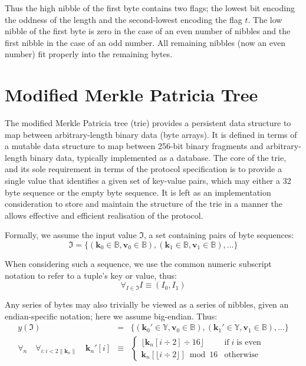 \documentclass[9pt,oneside]{amsart}
\begin{document}
Thus the high nibble of the first byte contains two flags; the lowest bit encoding the oddness of the length and the second-lowest encoding the flag $t$. The low nibble of the first byte is zero in the case of an even number of nibbles and the first nibble in the case of an odd number. All remaining nibbles (now an even number) fit properly into the remaining bytes.

\section{Modified Merkle Patricia Tree}\label{app:trie}
The modified Merkle Patricia tree (trie) provides a persistent data structure to map between arbitrary-length binary data (byte arrays). It is defined in terms of a mutable data structure to map between 256-bit binary fragments and arbitrary-length binary data, typically implemented as a database. The core of the trie, and its sole requirement in terms of the protocol specification is to provide a single value that identifies a given set of key-value pairs, which may either a 32 byte sequence or the empty byte sequence. It is left as an implementation consideration to store and maintain the structure of the trie in a manner the allows effective and efficient realisation of the protocol.

Formally, we assume the input value $\mathfrak{I}$, a set containing pairs of byte sequences:
\begin{equation}
\mathfrak{I} = \{ (\mathbf{k}_0 \in \mathbb{B}, \mathbf{v}_0 \in \mathbb{B}), (\mathbf{k}_1 \in \mathbb{B}, \mathbf{v}_1 \in \mathbb{B}), ... \}
\end{equation}

When considering such a sequence, we use the common numeric subscript notation to refer to a tuple's key or value, thus:
\begin{equation}
\forall_{I \in \mathfrak{I}} I \equiv (I_0, I_1)
\end{equation}

Any series of bytes may also trivially be viewed as a series of nibbles, given an endian-specific notation; here we assume big-endian. Thus:
\begin{eqnarray}
y(\mathfrak{I}) & = & \{ (\mathbf{k}_0' \in \mathbb{Y}, \mathbf{v}_0 \in \mathbb{B}), (\mathbf{k}_1' \in \mathbb{Y}, \mathbf{v}_1 \in \mathbb{B}), ... \} \\
\forall_n \quad \forall_{i: i < 2\lVert\mathbf{k}_n\rVert} \quad \mathbf{k}_n'[i] & \equiv &
\begin{cases}
\lfloor \mathbf{k}_n[i \div 2] \div 16 \rfloor & \text{if} \; i \; \text{is even} \\
\mathbf{k}_n[\lfloor i \div 2 \rfloor] \bmod 16 & \text{otherwise}
\end{cases}
\end{eqnarray}
\end{document}
